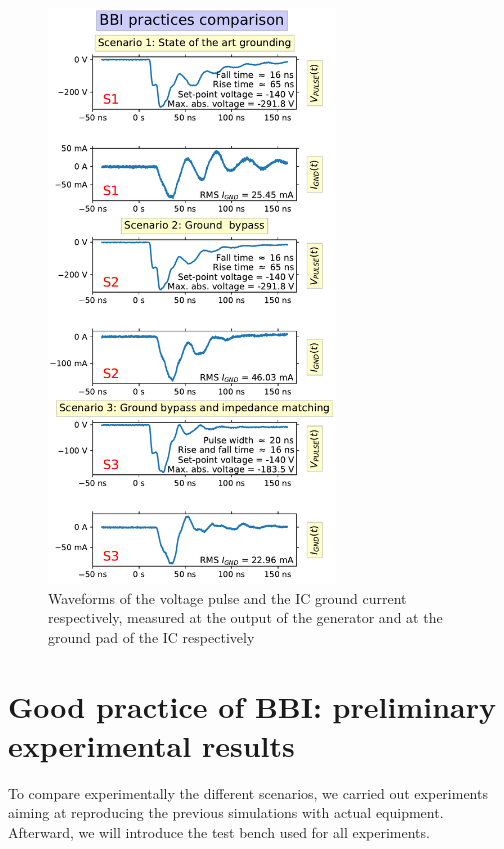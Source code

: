 \documentclass[10pt, conference, compsocconf]{IEEEtran}
\begin{document}
\begin{figure}[!ht]
\centering
\includegraphics[width=3in]{realPulsesComparisons.pdf}
\caption{Waveforms of the voltage pulse and the IC ground current respectively, measured at the output of the generator and at the ground pad of the IC respectively}
\label{pulseIgndAll}
\end{figure}

\section{Good practice of BBI:  preliminary experimental results}
To compare experimentally the different scenarios, we carried out experiments aiming at reproducing the previous simulations with actual equipment.
Afterward, we will introduce the test bench used for all experiments.

\end{document}
